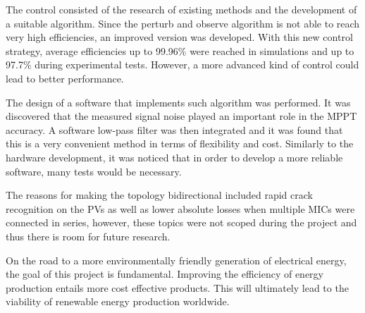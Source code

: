 The control consisted of the research of existing methods and the development of a suitable algorithm. Since the perturb and observe algorithm is not able to reach very high efficiencies, an improved version was developed. With this new control strategy, average efficiencies up to 99.96\% were reached in simulations and up to 97.7\% during experimental tests. However, a more advanced kind of control could lead to better performance.

The design of a software that implements such algorithm was performed. It was discovered that the measured signal noise played an important role in the MPPT accuracy. A software low-pass filter was then integrated and it was found that this is a very convenient method in terms of flexibility and cost. 
Similarly to the hardware development, it was noticed that in order to develop a more reliable software, many tests would be necessary.

The reasons for making the topology bidirectional included rapid crack recognition on the PVs as well as lower absolute losses when multiple MICs were connected in series, however, these topics were not scoped during the project and thus there is room for future research.

On the road to a more environmentally friendly generation of electrical energy, the goal of this project is fundamental. Improving the efficiency of energy production entails more cost effective products. This will ultimately lead to the viability of renewable energy production worldwide.